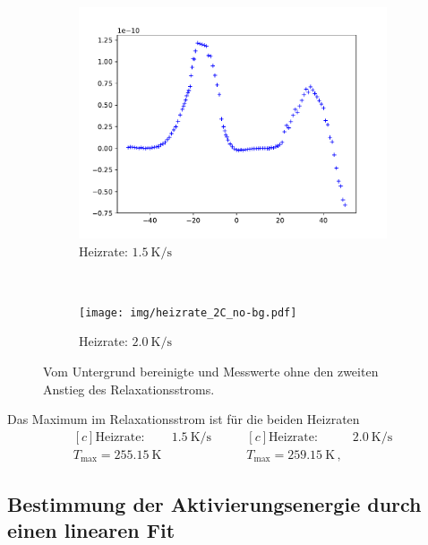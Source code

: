 \begin{figure}[htp]
    \centering
    \begin{subfigure}[t]{0.5\textwidth}
        \centering
        \includegraphics[width=\textwidth]{img/heizrate_15C_no-bg.pdf}
        \caption{Heizrate: $\SI{1.5}{\kelvin\per\second}$}
    \end{subfigure}%
    ~
    \begin{subfigure}[t]{0.5\textwidth}
        \centering
        \texttt{[image: img/heizrate\_2C\_no-bg.pdf]}
        \caption{Heizrate: $\SI{2.0}{\kelvin\per\second}$}
    \end{subfigure}
    \caption{Vom Untergrund bereinigte und Messwerte ohne den zweiten Anstieg des Relaxationsstroms.}
    \label{fig:no-bg}
\end{figure}

Das Maximum im Relaxationsstrom ist für die beiden Heizraten
\begin{equation*}
\begin{aligned}[c]
  \text{Heizrate: }& \SI{1.5}{\kelvin\per\second}\\
  T_\text{max} = \SI{255.15}{\kelvin}
\end{aligned}
\qquad
\begin{aligned}[c]
  \text{Heizrate: }& \SI{2.0}{\kelvin\per\second}\\
  T_\text{max} = \SI{259.15}{\kelvin}\,,
\end{aligned}
\end{equation*}

\subsection{Bestimmung der Aktivierungsenergie durch einen linearen Fit}
\label{sec:lin}

